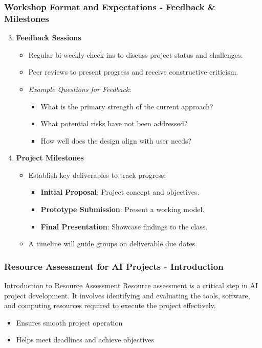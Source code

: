 \documentclass[aspectratio=169]{beamer}
\begin{document}
\begin{frame}[fragile]
    \frametitle{Workshop Format and Expectations - Feedback & Milestones}
    \begin{enumerate}
        \setcounter{enumi}{2}
        \item \textbf{Feedback Sessions}
            \begin{itemize}
                \item Regular bi-weekly check-ins to discuss project status and challenges.
                \item Peer reviews to present progress and receive constructive criticism.
                \item \textit{Example Questions for Feedback}:
                    \begin{itemize}
                        \item What is the primary strength of the current approach?
                        \item What potential risks have not been addressed?
                        \item How well does the design align with user needs?
                    \end{itemize}
            \end{itemize}
        \item \textbf{Project Milestones}
            \begin{itemize}
                \item Establish key deliverables to track progress:
                    \begin{itemize}
                        \item \textbf{Initial Proposal}: Project concept and objectives.
                        \item \textbf{Prototype Submission}: Present a working model.
                        \item \textbf{Final Presentation}: Showcase findings to the class.
                    \end{itemize}
                \item A timeline will guide groups on deliverable due dates.
            \end{itemize}
    \end{enumerate}
\end{frame}

\begin{frame}[fragile]
    \frametitle{Resource Assessment for AI Projects - Introduction}
    \begin{block}{Introduction to Resource Assessment}
        Resource assessment is a critical step in AI project development. It involves identifying and evaluating the tools, software, and computing resources required to execute the project effectively.
    \end{block}
    \begin{itemize}
        \item Ensures smooth project operation
        \item Helps meet deadlines and achieve objectives
    \end{itemize}
\end{frame}
\end{document}
